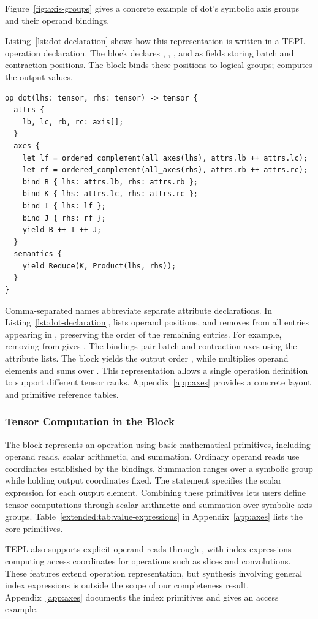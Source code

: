 Figure~\ref{fig:axis-groups} gives a concrete example of dot's symbolic
axis groups and their operand bindings.

Listing~\ref{lst:dot-declaration} shows how this representation is written
in a TEPL operation declaration. The  block declares ,
, , and  as  fields storing batch
and contraction positions. The  block binds these positions to
logical groups;  computes the output values.


\begin{lstlisting}[language=TEPL,
  caption={Axes IR representation of generalized dot, with explicit attributes, axis bindings, and value semantics.},
  label={lst:dot-declaration}]
op dot(lhs: tensor, rhs: tensor) -> tensor {
  attrs {
    lb, lc, rb, rc: axis[];
  }
  axes {
    let lf = ordered_complement(all_axes(lhs), attrs.lb ++ attrs.lc);
    let rf = ordered_complement(all_axes(rhs), attrs.rb ++ attrs.rc);
    bind B { lhs: attrs.lb, rhs: attrs.rb };
    bind K { lhs: attrs.lc, rhs: attrs.rc };
    bind I { lhs: lf };
    bind J { rhs: rf };
    yield B ++ I ++ J;
  }
  semantics {
    yield Reduce(K, Product(lhs, rhs));
  }
}
\end{lstlisting}
Comma-separated names abbreviate separate attribute declarations.
In Listing~\ref{lst:dot-declaration},  lists operand positions,
and  removes from  all entries
appearing in , preserving the order of the remaining entries.
For example, removing \code{[0,1]} from \code{[2,0,3,1]} gives \code{[2,3]}.
The bindings pair batch and contraction axes using the attribute
lists. The  block yields the output order ,
while  multiplies operand elements and sums over .
This representation allows a single operation definition to support
different tensor ranks. Appendix~\ref{app:axes} provides a concrete layout
and primitive reference tables.
\subsubsection{Tensor Computation in the \texorpdfstring{}{semantics} Block}
\label{sec:value-expressions}
The  block represents an operation using basic mathematical
primitives, including operand reads, scalar arithmetic, and summation.
Ordinary operand reads use coordinates established by the 
bindings. Summation ranges over a symbolic group while holding output
coordinates fixed. The  statement specifies the scalar
expression for each output element. Combining these primitives lets users
define tensor computations through scalar arithmetic and summation over
symbolic axis groups. Table~\ref{extended:tab:value-expressions} in
Appendix~\ref{app:axes} lists the core primitives.

TEPL also supports explicit operand reads through ,
with index expressions computing access coordinates for operations such
as slices and convolutions. These features extend operation representation,
but synthesis involving general index expressions is outside the scope
of our completeness result. Appendix~\ref{app:axes} documents the index
primitives and gives an access example.
